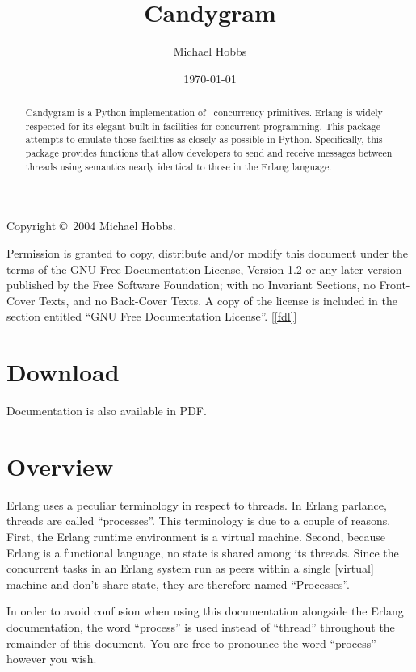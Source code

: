 \documentclass{howto}
\title{Candygram}
\date{\today}
\author{Michael Hobbs}
\newcommand{\Erlang}{\ulink{Erlang}{http://www.erlang.org/}}
\begin{document}
\maketitle

Copyright \copyright\ 2004 Michael Hobbs.

Permission is granted to copy, distribute and/or modify this document
under the terms of the GNU Free Documentation License, Version 1.2
or any later version published by the Free Software Foundation;
with no Invariant Sections, no Front-Cover Texts, and no Back-Cover Texts.
A copy of the license is included in the section entitled ``GNU
Free Documentation License''. [\ref{fdl}]

\begin{abstract}
\noindent
Candygram is a Python implementation of \Erlang\ concurrency primitives. Erlang
is widely respected for its elegant built-in facilities for concurrent
programming. This package attempts to emulate those facilities as closely as
possible in Python. Specifically, this package provides functions that allow
developers to send and receive messages between threads using semantics nearly
identical to those in the Erlang language.
\end{abstract}

\ifpdf
	\tableofcontents
\fi



\section{Download}


Documentation is also available in PDF.



\section{Overview}

\begin{notice}[note]
Erlang uses a peculiar terminology in respect to threads. In Erlang parlance,
threads are called ``processes''. This terminology is due to a couple of
reasons. First, the Erlang runtime environment is a virtual machine. Second,
because Erlang is a functional language, no state is shared among its threads.
Since the concurrent tasks in an Erlang system run as peers within a single
[virtual] machine and don't share state, they are therefore named ``Processes''.

In order to avoid confusion when using this documentation alongside the Erlang
documentation, the word ``process'' is used instead of ``thread'' throughout the
remainder of this document. You are free to pronounce the word ``process''
however you wish.
\end{notice}
\end{document}
